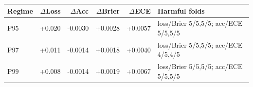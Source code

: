 \begin{tabular}{@{}lrrrrl@{}}
  \toprule
  Regime & $\Delta$Loss & $\Delta$Acc & $\Delta$Brier & $\Delta$ECE & Harmful folds \\
  \midrule
  P95 & +0.020 & -0.0030 & +0.0028 & +0.0057 & loss/Brier 5/5,5/5; acc/ECE 5/5,5/5 \\
  P97 & +0.011 & -0.0014 & +0.0018 & +0.0040 & loss/Brier 5/5,5/5; acc/ECE 4/5,4/5 \\
  P99 & +0.008 & -0.0014 & +0.0019 & +0.0067 & loss/Brier 5/5,5/5; acc/ECE 5/5,5/5 \\
  \bottomrule
\end{tabular}
